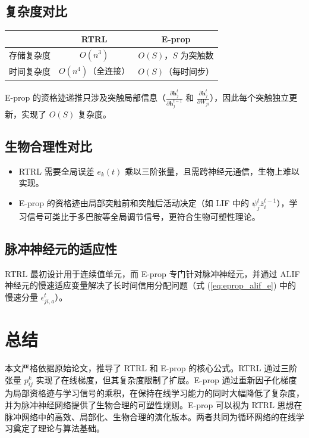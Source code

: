 \documentclass{article}
\begin{document}
\subsection{复杂度对比}

\begin{center}
\begin{tabular}{|c|c|c|}
\hline
 & RTRL & E-prop \\
\hline
存储复杂度 & $O(n^3)$ & $O(S)$，$S$ 为突触数 \\
时间复杂度 & $O(n^4)$（全连接） & $O(S)$（每时间步） \\
\hline
\end{tabular}
\end{center}

E-prop 的资格迹递推只涉及突触局部信息（$\frac{\partial \mathbf{h}_j^t}{\partial \mathbf{h}_j^{t-1}}$ 和 $\frac{\partial \mathbf{h}_j^t}{\partial W_{ji}}$），因此每个突触独立更新，实现了 $O(S)$ 复杂度。

\subsection{生物合理性对比}

\begin{itemize}
    \item RTRL 需要全局误差 $e_k(t)$ 乘以三阶张量，且需跨神经元通信，生物上难以实现。
    \item E-prop 的资格迹由局部突触前和突触后活动决定（如 LIF 中的 $\psi_j^t \bar{z}_i^{t-1}$），学习信号可类比于多巴胺等全局调节信号，更符合生物可塑性理论。
\end{itemize}

\subsection{脉冲神经元的适应性}

RTRL 最初设计用于连续值单元，而 E-prop 专门针对脉冲神经元，并通过 ALIF 神经元的慢速适应变量解决了长时间信用分配问题（式 (\ref{eq:eprop_alif_e}) 中的慢速分量 $\epsilon_{ji,a}^t$）。

\section{总结}

本文严格依据原始论文，推导了 RTRL 和 E-prop 的核心公式。RTRL 通过三阶张量 $p_{ij}^k$ 实现了在线梯度，但其复杂度限制了扩展。E-prop 通过重新因子化梯度为局部资格迹与学习信号的乘积，在保持在线学习能力的同时大幅降低了复杂度，并为脉冲神经网络提供了生物合理的可塑性规则。E-prop 可以视为 RTRL 思想在脉冲网络中的高效、局部化、生物合理的演化版本。两者共同为循环网络的在线学习奠定了理论与算法基础。
\end{document}
